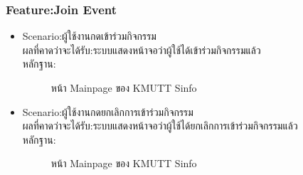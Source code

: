 \documentclass[14pt,oneside,openright,a4paper]{cpe-thai-project}
\begin{document}
\subsubsection{Feature:Join Event}
\begin{itemize}
  \item Scenario:ผู้ใช้งานกดเข้าร่วมกิจกรรม\\ผลที่คาดว่าจะได้รับ:ระบบแสดงหน้าจอว่าผู้ใช้ได้เข้าร่วมกิจกรรมแล้ว\\หลักฐาน:\\
  \begin{figure}[!h]\centering
    \setlength{\fboxrule}{0.5mm} %
    \setlength{\fboxsep}{0.5cm}
    \caption{หน้า Mainpage ของ KMUTT Sinfo}\label{fig:sinfo}
  \end{figure}
\end{itemize}
\newpage
\begin{itemize}
  \item Scenario:ผู้ใช้งานกดยกเลิกการเข้าร่วมกิจกรรม\\ผลที่คาดว่าจะได้รับ:ระบบแสดงหน้าจอว่าผู้ใช้ได้ยกเลิกการเข้าร่วมกิจกรรมแล้ว\\หลักฐาน:\\
  \begin{figure}[!h]\centering
    \setlength{\fboxrule}{0.5mm} %
    \setlength{\fboxsep}{0.5cm}
    \caption{หน้า Mainpage ของ KMUTT Sinfo}\label{fig:sinfo}
  \end{figure}
\end{itemize}
\newpage
\end{document}
